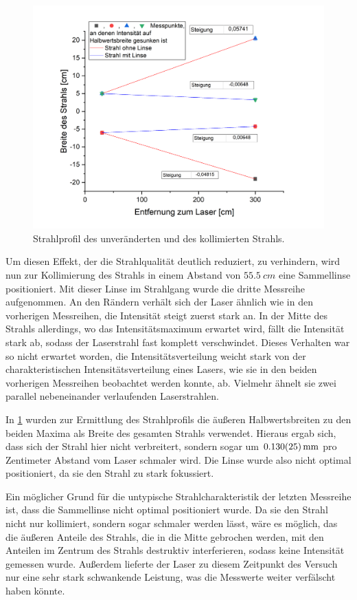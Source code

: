 \documentclass[
	a4paper,
	12pt,
	pagesize,
	ngerman
]{scrartcl}
\begin{document}
\begin{figure}[h!]
	\centering
	\includegraphics[scale=0.7]{strahlprofil.png}
	\caption{Strahlprofil des unveränderten und des kollimierten Strahls.}
	\label{strahlprofil}
\end{figure}

Um diesen Effekt, der die Strahlqualität deutlich reduziert, zu verhindern, wird nun zur Kollimierung des Strahls in einem Abstand von $\SI{55,5}{cm}$ eine Sammellinse positioniert. Mit dieser Linse im Strahlgang wurde die dritte Messreihe aufgenommen. An den Rändern verhält sich der Laser ähnlich wie in den vorherigen Messreihen, die Intensität steigt zuerst stark an. In der Mitte des Strahls allerdings, wo das Intensitätsmaximum erwartet wird, fällt die Intensität stark ab, sodass der Laserstrahl fast komplett verschwindet. Dieses Verhalten war so nicht erwartet worden, die Intensitätsverteilung weicht stark von der charakteristischen Intensitätsverteilung eines Lasers, wie sie in den beiden vorherigen Messreihen beobachtet werden konnte, ab. Vielmehr ähnelt sie zwei parallel nebeneinander verlaufenden Laserstrahlen.

In \cref{strahlprofil} wurden zur Ermittlung des Strahlprofils die äußeren Halbwertsbreiten zu den beiden Maxima als Breite des gesamten Strahls verwendet. Hieraus ergab sich, dass sich der Strahl hier nicht verbreitert, sondern sogar um $\SI{0,130\pm0,025}{mm}$ pro Zentimeter Abstand vom Laser schmaler wird. Die Linse wurde also nicht optimal positioniert, da sie den Strahl zu stark fokussiert.

Ein möglicher Grund für die untypische Strahlcharakteristik der letzten Messreihe ist, dass die Sammellinse nicht optimal positioniert wurde. Da sie den Strahl nicht nur kollimiert, sondern sogar schmaler werden lässt, wäre es möglich, das die äußeren Anteile des Strahls, die in die Mitte gebrochen werden, mit den Anteilen im Zentrum des Strahls destruktiv interferieren, sodass keine Intensität gemessen wurde. Außerdem lieferte der Laser zu diesem Zeitpunkt des Versuch nur eine sehr stark schwankende Leistung, was die Messwerte weiter verfälscht haben könnte.
\end{document}
